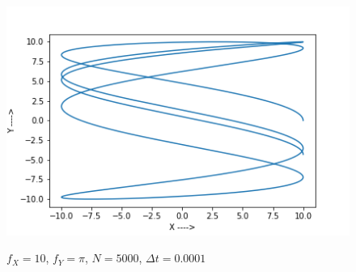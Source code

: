 \documentclass{report}
\begin{document}
\begin{figure}[H]
	\centering
	\includegraphics[width = \textwidth]{pi.png}
	\label{open2}
	\caption{$f_X=10$, $f_Y=\pi$, $N=5000$, $\Delta t=0.0001$}
\end{figure}
\pagebreak
\end{document}
